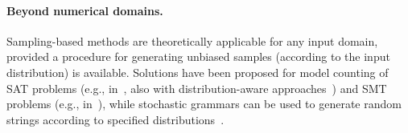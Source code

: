 \paragraph{Beyond numerical domains.}
Sampling-based methods are theoretically applicable for any input domain, provided a procedure for generating unbiased samples (according to the input distribution) is available. Solutions have been proposed for model counting of SAT problems (e.g., in~\cite{satCounting01,biere2009handbook,journalscorrMeel14}, also with distribution-aware approaches~\cite{chakraborty2014distribution}) and SMT problems (e.g., in~\cite{countingSMT}), while stochastic grammars can be used to generate random strings according to specified distributions~\cite{stochasticGrammars}. 
%
%
%



